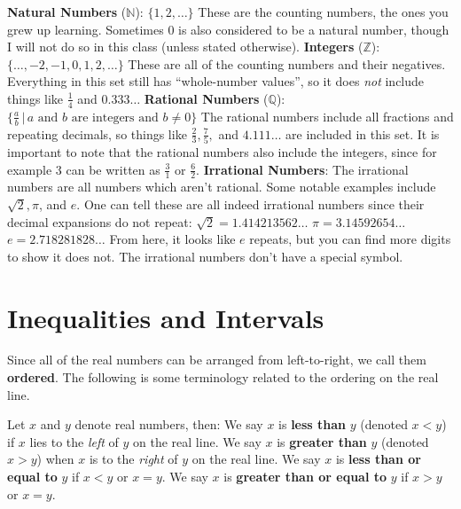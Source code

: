 \documentclass{article}
\newcommand{\tb}[1]{\textbf{#1}}
\begin{document}
\begin{outline}
    \1 \tb{Natural Numbers} ($\mathbb{N}$): $\{1, 2, \ldots\}$ These are the counting numbers, the ones you grew up learning. Sometimes $0$ is also considered to be a natural number, though I will not do so in this class (unless stated otherwise).
    \1 \tb{Integers} ($\mathbb{Z}$): $\{\ldots, -2, -1, 0, 1, 2, \ldots\}$ These are all of the counting numbers and their negatives. Everything in this set still has ``whole-number values'', so it does \emph{not} include things like $\frac{1}{4}$ and $0.333 \ldots$
    \1 \tb{Rational Numbers} ($\mathbb{Q}$): $\{\frac{a}{b}\,|\, a \textrm{ and } b \textrm{ are integers and } b \neq 0\}$ The rational numbers include all fractions and repeating decimals, so things like $\frac{2}{3}, \frac{7}{5},$ and $4.111\ldots$ are included in this set. It is important to note that the rational numbers also include the integers, since for example $3$ can be written as $\frac{3}{1}$ or $\frac{6}{2}$.
    \1 \tb{Irrational Numbers}: The irrational numbers are all numbers which aren't rational. Some notable examples include $\sqrt{2}, \pi$, and $e$. One can tell these are all indeed irrational numbers since their decimal expansions do not repeat:
        \2 $\sqrt{2} = 1.414213562 \ldots$
        \2 $\pi = 3.14592654 \ldots$
        \2 $e = 2.718281828 \ldots$
    \1[] From here, it looks like $e$ repeats, but you can find more digits to show it does not. The irrational numbers don't have a special symbol.
\end{outline}

\section{Inequalities and Intervals}

Since all of the real numbers can be arranged from left-to-right, we call them \tb{ordered}. The following is some terminology related to the ordering on the real line.

\vspace{5pt}
\begin{outline}
    \0 Let $x$ and $y$ denote real numbers, then:
    \1 We say $x$ is \tb{less than} $y$ (denoted $x<y$) if $x$ lies to the \emph{left} of $y$ on the real line.
    \1 We say $x$ is \tb{greater than} $y$ (denoted $x>y$) when $x$ is to the \emph{right} of $y$ on the real line.
    \1 We say $x$ is \tb{less than or equal to} $y$ if $x<y$ or $x=y$.
    \1 We say $x$ is \tb{greater than or equal to} $y$ if $x>y$ or $x=y$.
\end{outline}
\end{document}

